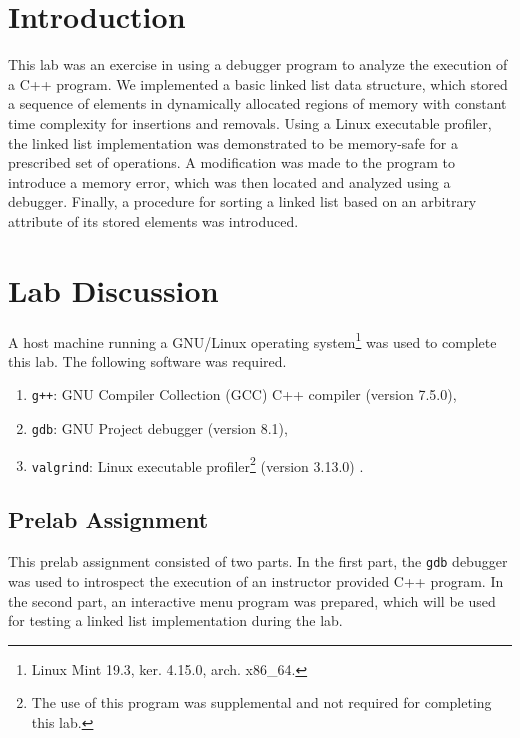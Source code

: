 \documentclass[11pt, letterpaper]{article} %
\begin{document}
\makelabtitle

\section*{Introduction}

This lab was an exercise in using a debugger program to analyze the execution of a C++ program. We implemented a basic linked list data structure, which stored a sequence of elements in dynamically allocated regions of memory with constant time complexity for insertions and removals. Using a Linux executable profiler, the linked list implementation was demonstrated to be memory-safe for a prescribed set of operations. A modification was made to the program to introduce a memory error, which was then located and analyzed using a debugger. Finally, a procedure for sorting a linked list based on an arbitrary attribute of its stored elements was introduced.


\section*{Lab Discussion}

A host machine running a GNU/Linux operating system\footnote{Linux Mint 19.3, ker. 4.15.0, arch. x86\_64.}  was used to complete this lab. The following software was required.
\begin{enumerate}
    \item \texttt{g++}: GNU Compiler Collection (GCC) C++ compiler (version 7.5.0),
    \item \texttt{gdb}: GNU Project debugger (version 8.1),
    \item \texttt{valgrind}: Linux executable profiler\footnote{The use of this program was supplemental and not required for completing this lab.} (version 3.13.0) \cite{valgrind}.
\end{enumerate}
 
\subsection*{Prelab Assignment}

This prelab assignment consisted of two parts. In the first part, the \texttt{gdb} debugger was used to introspect the execution of an instructor provided C++ program. In the second part, an interactive menu program was prepared, which will be used for testing a linked list implementation during the lab.
\end{document}

